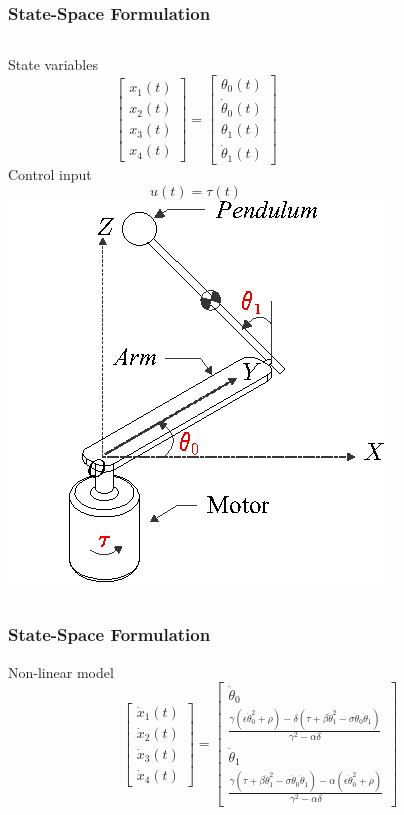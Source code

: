 \documentclass[]{beamer}
\begin{document}
\begin{frame}
	\frametitle{State-Space Formulation}
	  	\begin{columns}[c]
		\column{2in}  %
State variables
\begin{equation*}
\begin{bmatrix}
x_1(t)\\x_2(t)\\x_3(t)\\x_4(t)
\end{bmatrix} = \begin{bmatrix}
\theta_0(t)\\\dot{\theta}_0(t)\\\theta_1(t)\\\dot{\theta}_1(t)
\end{bmatrix}
\end{equation*}
Control input
\begin{equation*}
u(t) = \tau (t)
\end{equation*}
		\column{2in}
		\includegraphics[scale=0.55]{images/furuta2.png}
	\end{columns}
\end{frame}
\begin{frame}
	\frametitle{State-Space Formulation}
	Non-linear model
	\begin{equation*}
	\begin{bmatrix}
	\dot{x}_1(t) \\ \dot{x}_2(t) \\ \dot{x}_3(t) \\ \dot{x}_4(t)
	\end{bmatrix} = \begin{bmatrix}
	\dot{\theta}_0\\
	\frac{\gamma(\epsilon\dot{\theta}_0^2+\rho)-\delta(\tau+\beta\dot{\theta}_1^2-\sigma\dot{\theta}_0\dot{\theta}_1)}{\gamma^2-\alpha\delta}\\
	\dot{\theta}_1\\
	\frac{\gamma(\tau+\beta\dot{\theta}_1^2-\sigma\dot{\theta}_0\dot{\theta}_1)-\alpha(\epsilon\dot{\theta}_0^2+\rho)}{\gamma^2-\alpha\delta}
	\end{bmatrix}
	\end{equation*}
\end{frame}
\end{document}
